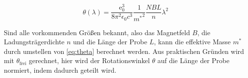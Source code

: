 \begin{equation}
    \theta(\lambda)=\frac{\text{e}_0^3}{8\pi^2\epsilon_0c^3}\frac{1}{{m^*}^2}\frac{NBL}{n}\lambda^2\,
    \label{eq:theta}
\end{equation}

Sind alle vorkommenden Größen bekannt, also das Magnetfeld $B$, die Ladungsträgerdichte $n$ und die Länge der Probe $L$, kann die effektive Masse
$m^*$ durch umstellen von \eqref{eq:theta} berechnet werden.
Aus praktischen Gründen wird mit $\theta_\text{frei}$ gerechnet, hier wird der Rotationswinkel $\theta$ auf die Länge der Probe normiert, indem dadurch
geteilt wird.